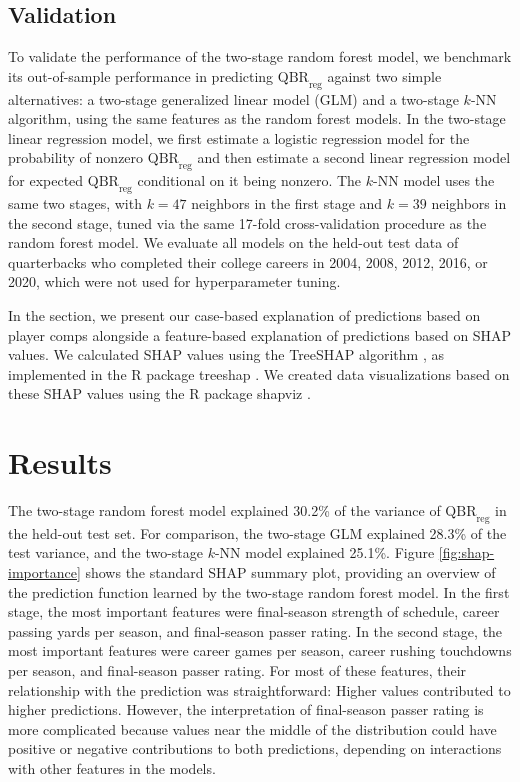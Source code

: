 \documentclass[Review, sageh, times, doublespace]{sagej}
\newcommand{\revision}[1]{{\color{orange} #1}}
\begin{document}
\subsection{Validation}

To validate the performance of the two-stage random forest model, we benchmark its out-of-sample performance in predicting $\text{QBR}_\text{reg}$ against two simple alternatives: a two-stage generalized linear model (GLM) and a two-stage $k$-NN algorithm, using the same features as the random forest models. In the two-stage linear regression model, we first estimate a logistic regression model for the probability of nonzero $\text{QBR}_\text{reg}$ and then estimate a second linear regression model for expected $\text{QBR}_\text{reg}$ conditional on it being nonzero. The $k$-NN model uses the same two stages, with $k = 47$ neighbors in the first stage and $k = 39$ neighbors in the second stage, tuned via the same 17-fold cross-validation procedure as the random forest model. We evaluate all models on the held-out test data of quarterbacks who completed their college careers in 2004, 2008, 2012, 2016, or 2020, which were not used for hyperparameter tuning.

\revision{
  In the  section, we present our case-based explanation of predictions based on player comps alongside a feature-based explanation of predictions based on SHAP values. We calculated SHAP values using the TreeSHAP algorithm \citep{lundberg_local_2020}, as implemented in the R package treeshap \citep{mayer_treeshap_2026}. We created data visualizations based on these SHAP values using the R package shapviz \citep{mayer_shapviz_2025}.
}

\section{Results}
\label{sec:results}

The two-stage random forest model explained \revision{30.2\%} of the variance of $\text{QBR}_\text{reg}$ in the held-out test set. For comparison, the two-stage GLM explained 28.3\% of the test variance, and the two-stage $k$-NN model explained 25.1\%. \revision{Figure \ref{fig:shap-importance} shows the standard SHAP summary plot, providing an overview of the prediction function learned by the two-stage random forest model. In the first stage, the most important features were final-season strength of schedule, career passing yards per season, and final-season passer rating. In the second stage, the most important features were career games per season, career rushing touchdowns per season, and final-season passer rating. For most of these features, their relationship with the prediction was straightforward: Higher values contributed to higher predictions. However, the interpretation of final-season passer rating is more complicated because values near the middle of the distribution could have positive or negative contributions to both predictions, depending on interactions with other features in the models.}
\end{document}
